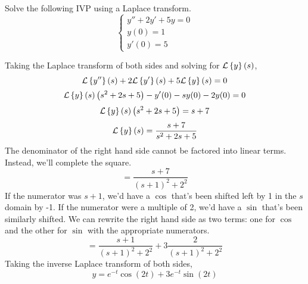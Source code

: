 \begin{example}
	Solve the following IVP using a Laplace transform.
	\begin{equation*}
		\begin{cases}
			y'' + 2y' + 5y = 0 \\
			y(0) = 1 \\
			y'(0) = 5
		\end{cases}
	\end{equation*}
\end{example}
\noindent
Taking the Laplace transform of both sides and solving for $\mathcal{L}\left\{ y \right\}\left(s\right)$,
\begin{equation*}
	\mathcal{L}\left\{ y'' \right\}\left(s\right) + 2\mathcal{L}\left\{ y' \right\}\left(s\right) + 5\mathcal{L}\left\{ y \right\}\left(s\right) = 0
\end{equation*}
\begin{equation*}
	\mathcal{L}\left\{ y \right\}\left(s\right)\left(s^2 + 2s + 5\right) - y'(0) - sy(0) - 2y(0) = 0
\end{equation*}
\begin{equation*}
	\mathcal{L}\left\{ y \right\}\left(s\right)\left(s^2 + 2s + 5\right) = s + 7
\end{equation*}
\begin{equation*}
	\mathcal{L}\left\{ y \right\}\left(s\right) = \frac{s + 7}{s^2 + 2s + 5}
\end{equation*}
The denominator of the right hand side cannot be factored into linear terms. Instead, we'll complete the square.
\begin{equation*}
	= \frac{s + 7}{(s+1)^2 + 2^2}
\end{equation*}
If the numerator was $s+1$, we'd have a $\cos$ that's been shifted left by 1 in the $s$ domain by -1. If the numerator were a multiple of 2, we'd have a $\sin$ that's been similarly shifted. We can rewrite the right hand side as two terms: one for $\cos$ and the other for $\sin$ with the appropriate numerators.
\begin{equation*}
	= \frac{s+1}{(s+1)^2 + 2^2} + 3\frac{2}{(s+1)^2 + 2^2}
\end{equation*}
Taking the inverse Laplace transform of both sides,
\begin{equation*}
	y = e^{-t}\cos{(2t)} + 3e^{-t}\sin{(2t)}
\end{equation*}

